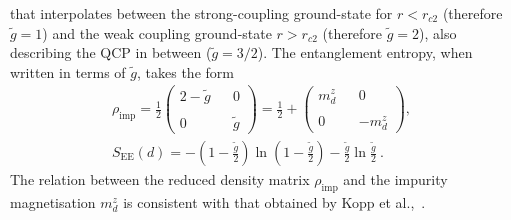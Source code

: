 \documentclass{iopart}
\begin{document}
that interpolates between the strong-coupling ground-state for \(r < r_{c2}\) (therefore \(\tilde g = 1\)) and the weak coupling ground-state \(r > r_{c2}\) (therefore \(\tilde g = 2\)), also describing the QCP in between (\(\tilde g = 3/2\)). The entanglement entropy, when written in terms of \(\tilde g\), takes the form
\begin{eqnarray}
	\rho_\text{imp} = \frac{1}{2}\begin{pmatrix} 2-\tilde g && 0 \\ \\ 0 && \tilde g \end{pmatrix} = \frac{1}{2} + \begin{pmatrix} m_d^z && 0 \\ \\ 0 && -m_d^z \end{pmatrix},\\
	S_\text{EE}(d) = -\left( 1 - \frac{\tilde g}{2} \right) \ln \left( 1 - \frac{\tilde g}{2} \right) - \frac{\tilde g}{2}\ln \frac{\tilde g}{2} ~.
\end{eqnarray}
The relation between the reduced density matrix \(\rho_\text{imp}\) and the impurity magnetisation \(m_d^z\) is consistent with that obtained by Kopp et al.,~\cite{kopp_chakravarty_2007}.
\end{document}
